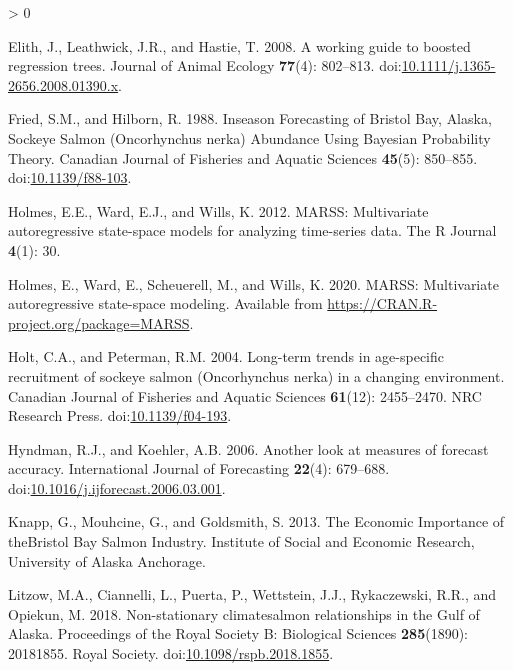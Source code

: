 \documentclass[
]{article}
\newlength{\cslhangindent}
\newenvironment{CSLReferences}[2] %
 {%
  \setlength{\parindent}{0pt}
  \ifodd #1 \everypar{\setlength{\hangindent}{\cslhangindent}}\ignorespaces\fi
  \ifnum #2 > 0
  \setlength{\parskip}{#2\baselineskip}
  \fi
 }%
 {}
\begin{document}
\begin{CSLReferences}{1}{0}
\leavevmode\hypertarget{ref-elith2008}{}%
Elith, J., Leathwick, J.R., and Hastie, T. 2008. A working guide to boosted regression trees. Journal of Animal Ecology \textbf{77}(4): 802--813. doi:\href{https://doi.org/10.1111/j.1365-2656.2008.01390.x}{10.1111/j.1365-2656.2008.01390.x}.

\leavevmode\hypertarget{ref-fried1988}{}%
Fried, S.M., and Hilborn, R. 1988. Inseason {Forecasting} of {Bristol Bay}, {Alaska}, {Sockeye Salmon} ({Oncorhynchus} nerka) {Abundance Using Bayesian Probability Theory}. Canadian Journal of Fisheries and Aquatic Sciences \textbf{45}(5): 850--855. doi:\href{https://doi.org/10.1139/f88-103}{10.1139/f88-103}.

\leavevmode\hypertarget{ref-holmes2012}{}%
Holmes, E.E., Ward, E.J., and Wills, K. 2012. MARSS: Multivariate autoregressive state-space models for analyzing time-series data. The R Journal \textbf{4}(1): 30.

\leavevmode\hypertarget{ref-holmes2020}{}%
Holmes, E., Ward, E., Scheuerell, M., and Wills, K. 2020. MARSS: Multivariate autoregressive state-space modeling. Available from \url{https://CRAN.R-project.org/package=MARSS}.

\leavevmode\hypertarget{ref-holt2004}{}%
Holt, C.A., and Peterman, R.M. 2004. Long-term trends in age-specific recruitment of sockeye salmon ({Oncorhynchus} nerka) in a changing environment. Canadian Journal of Fisheries and Aquatic Sciences \textbf{61}(12): 2455--2470. {NRC Research Press}. doi:\href{https://doi.org/10.1139/f04-193}{10.1139/f04-193}.

\leavevmode\hypertarget{ref-hyndman2006}{}%
Hyndman, R.J., and Koehler, A.B. 2006. Another look at measures of forecast accuracy. International Journal of Forecasting \textbf{22}(4): 679--688. doi:\href{https://doi.org/10.1016/j.ijforecast.2006.03.001}{10.1016/j.ijforecast.2006.03.001}.

\leavevmode\hypertarget{ref-knapp2013}{}%
Knapp, G., Mouhcine, G., and Goldsmith, S. 2013. The {Economic Importance} of {theBristol Bay Salmon Industry}. {Institute of Social and Economic Research}, {University of Alaska Anchorage}.

\leavevmode\hypertarget{ref-litzow2018}{}%
Litzow, M.A., Ciannelli, L., Puerta, P., Wettstein, J.J., Rykaczewski, R.R., and Opiekun, M. 2018. Non-stationary climate{}salmon relationships in the {Gulf} of {Alaska}. Proceedings of the Royal Society B: Biological Sciences \textbf{285}(1890): 20181855. {Royal Society}. doi:\href{https://doi.org/10.1098/rspb.2018.1855}{10.1098/rspb.2018.1855}.


\end{CSLReferences}
\end{document}
